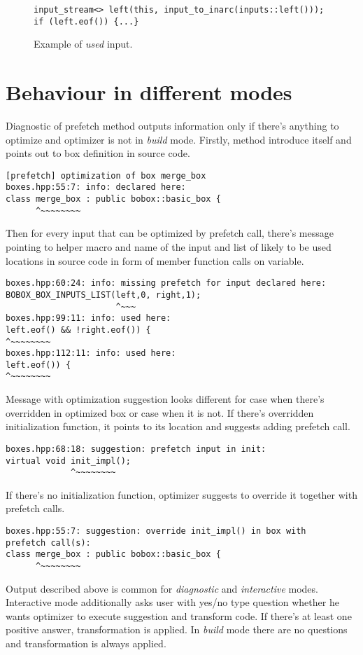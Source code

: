 \begin{figure}[h!]
\caption{Example of \emph{used} input.}
\label{prefetch-used}
\begin{lstlisting}
input_stream<> left(this, input_to_inarc(inputs::left()));
if (left.eof()) {...}
\end{lstlisting}
\end{figure}

\section{Behaviour in different modes}
Diagnostic of prefetch method outputs information only if there's anything to optimize and optimizer is not in \emph{build} mode. Firstly, method introduce itself and points out to box definition in source code.

\begin{verbatim}
[prefetch] optimization of box merge_box
boxes.hpp:55:7: info: declared here:
class merge_box : public bobox::basic_box {
      ^~~~~~~~~
\end{verbatim}

Then for every input that can be optimized by prefetch call, there's message pointing to helper macro and name of the input and list of likely to be used locations in source code in form of member function calls on variable.

\begin{verbatim}
boxes.hpp:60:24: info: missing prefetch for input declared here:
BOBOX_BOX_INPUTS_LIST(left,0, right,1);
                      ^~~~
boxes.hpp:99:11: info: used here:
left.eof() && !right.eof()) {
^~~~~~~~~
boxes.hpp:112:11: info: used here:
left.eof()) {
^~~~~~~~~
\end{verbatim}

Message with optimization suggestion looks different for case when there's  overridden in optimized box or case when it is not. If there's overridden initialization function, it points to its location and suggests adding prefetch call.

\begin{verbatim}
boxes.hpp:68:18: suggestion: prefetch input in init:
virtual void init_impl();
             ^~~~~~~~~
\end{verbatim}

If there's no initialization function, optimizer suggests to override it together with prefetch calls.

\begin{verbatim}
boxes.hpp:55:7: suggestion: override init_impl() in box with
prefetch call(s):
class merge_box : public bobox::basic_box {
      ^~~~~~~~~
\end{verbatim}

Output described above is common for \emph{diagnostic} and \emph{interactive} modes. Interactive mode additionally asks user with yes/no type question whether he wants optimizer to execute suggestion and transform code. If there's at least one positive answer, transformation is applied. In \emph{build} mode there are no questions and transformation is always applied.